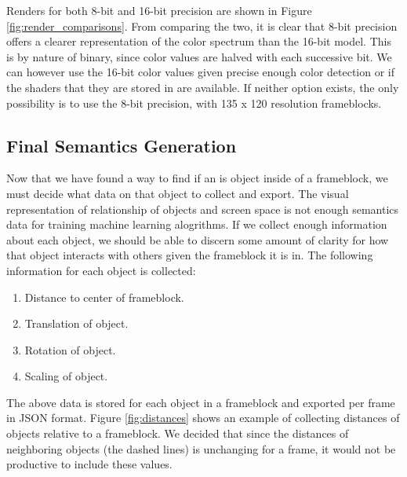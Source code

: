 \documentclass[conference]{IEEEtran}
\begin{document}
Renders for both 8-bit and 16-bit precision are shown in
Figure \ref{fig:render_comparisons}.
From comparing the two, it is clear that 8-bit precision offers a clearer representation
of the color spectrum than the 16-bit model.
This is by nature of binary, since color values are halved with each successive bit.
We can however use the 16-bit color values given precise enough color detection
or if the shaders that they are stored in are available.
If neither option exists, the only possibility is to use the 8-bit precision,
with 135 x 120 resolution frameblocks.

\subsection{Final Semantics Generation}
Now that we have found a way to find if an is object inside of a frameblock,
we must decide what data on that object to collect and export.
The visual representation of relationship of objects and screen space
is not enough semantics data for training machine learning alogrithms.
If we collect enough information about each object,
we should be able to discern some amount of clarity
for how that object interacts with others given the frameblock it is in.
The following information for each object is collected:
\bigskip
\begin{enumerate}
\item Distance to center of frameblock.
\item Translation of object.
\item Rotation of object.
\item Scaling of object.
\end{enumerate}
\bigskip

The above data is stored for each object in a frameblock and exported
per frame in JSON format.
Figure \ref{fig:distances} shows an example of collecting
distances of objects relative to a frameblock.
We decided that since the distances of neighboring objects (the dashed lines)
is unchanging for a frame, it would not be productive to include these values.
\end{document}
